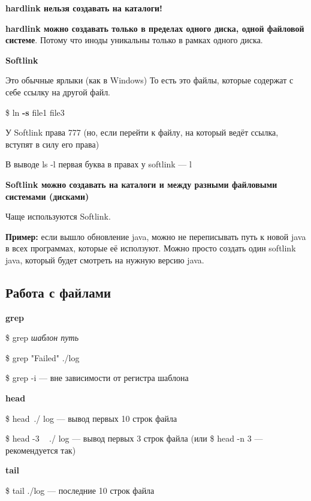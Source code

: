 \documentclass[oneside, final, 14pt]{extreport} %
\begin{document}
\vspace*{\baselineskip}

\textbf{hardlink нельзя создавать на каталоги!}

\textbf{hardlink можно создавать только в пределах одного диска, одной файловой системе}. 
Потому что иноды уникальны только в рамках одного диска.

\vspace*{\baselineskip}

\textbf{Softlink}

Это обычные ярлыки (как в Windows)
То есть это файлы, которые содержат с себе ссылку на другой файл.

\$ ln \textbf{-s} file1 file3

У Softlink права 777 (но, если перейти к файлу, на который ведёт ссылка, вступят в силу его права)

В выводе ls -l первая буква в правах у softlink --- l

\textbf{Softlink можно создавать на каталоги и между разными файловыми системами (дисками)}

Чаще используются Softlink. 

\textbf{Пример:} если вышло обновление java, можно не переписывать путь к новой java в всех программах, которые 
её исползуют. Можно просто создать один softlink java, который будет смотреть на нужную версию java.


\subsection{Работа с файлами}

\textbf{grep}

\$ grep \textit{шаблон путь}

\$ grep "Failed" \hspace{0.1cm} ./log

\$ grep -i --- вне зависимости от регистра шаблона

\vspace*{\baselineskip}

\textbf{head}

\$ head~./ log --- вывод первых 10 строк файла

\$ head -3 ~ ./ log --- вывод первых 3 строк файла (или \$ head -n 3 --- рекомендуется так)

\vspace*{\baselineskip}

\textbf{tail}

\$ tail ./log --- последние 10 строк файла
\end{document}
